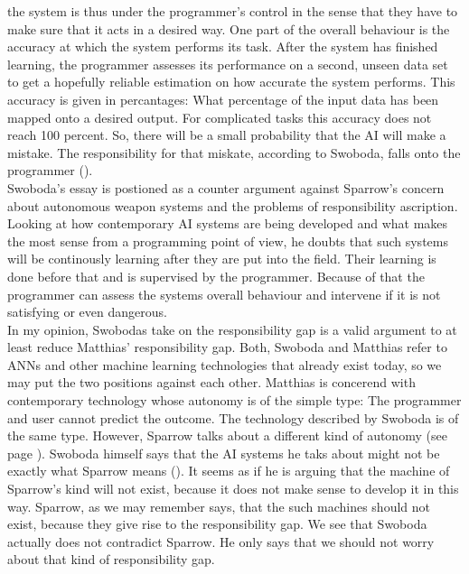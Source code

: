 \documentclass{article}
\begin{document}
the system is thus under the programmer's control in the sense that they have to
make sure that it acts in a desired way. One part of the overall behaviour is
the accuracy at which the system performs its task. After the system has
finished learning, the programmer assesses its performance on a second, unseen
data set to get a hopefully reliable estimation on how accurate the system
performs. This accuracy is given in percantages: What percentage of the input
data has been mapped onto a desired output. For complicated tasks this accuracy
does not reach 100 percent. So, there will be a small probability that the
AI will make a mistake. The responsibility for that miskate, according to
Swoboda, falls onto the programmer (\cite[p. 310]{swoboda2017autonomous}).\\
Swoboda's essay is postioned as a counter argument against Sparrow's concern
about autonomous weapon systems and the problems of responsibility ascription.
Looking at how contemporary AI systems are being developed and what makes the
most sense from a programming point of view, he doubts that such systems will be
continously learning after they are put into the field. Their learning is done
before that and is supervised by the programmer. Because of that the programmer
can assess the systems overall behaviour and intervene if it is not satisfying
or even dangerous.\\
In my opinion, Swobodas take on the responsibility gap is a valid
argument to at least reduce Matthias' responsibility gap. Both, Swoboda and
Matthias refer to ANNs and other machine learning technologies that already
exist today, so we may put the two positions against each other. Matthias is
concerend with contemporary technology whose autonomy is of the simple type: The
programmer and user cannot predict the outcome. The technology described by
Swoboda is of the same type. However, Sparrow talks about a different kind of
autonomy (see page \pageref{sparrowmatthiasdiff}). Swoboda himself says that the
AI systems he taks about might not be exactly what Sparrow means (\cite[p.
309]{swoboda2017autonomous}). It seems as if he is arguing that the machine of
Sparrow's kind will not exist, because it does not make sense to develop it in
this way. Sparrow, as we may remember says, that the such machines should not
exist, because they give rise to the responsibility gap. We see that Swoboda
actually does not contradict Sparrow. He only says that we should not worry
about that kind of responsibility gap.\\
\end{document}
